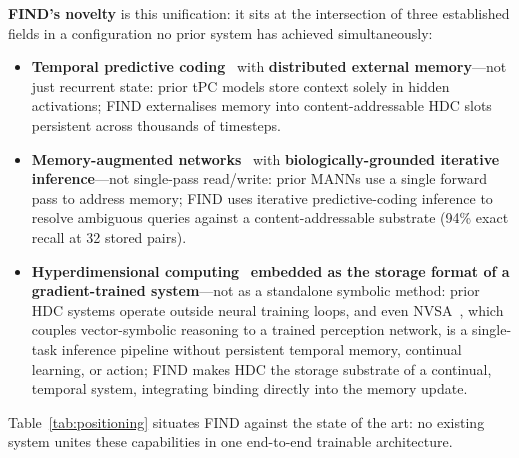 \noindent\textbf{FIND's novelty} is this unification: it sits at the intersection of three established fields in a configuration no prior system has achieved simultaneously:
\begin{itemize}[noitemsep,topsep=2pt]
  \item \textbf{Temporal predictive coding}~\cite{millidge2024temporal} with \textbf{distributed external memory}---not just recurrent state: prior tPC models store context solely in hidden activations; FIND externalises memory into content-addressable HDC slots persistent across thousands of timesteps.
  \item \textbf{Memory-augmented networks}~\cite{graves2016dnc} with \textbf{biologically-grounded iterative inference}---not single-pass read/write: prior MANNs use a single forward pass to address memory; FIND uses iterative predictive-coding inference to resolve ambiguous queries against a content-addressable substrate (94\% exact recall at 32 stored pairs).
  \item \textbf{Hyperdimensional computing}~\cite{kanerva2009hyperdimensional} \textbf{embedded as the storage format of a gradient-trained system}---not as a standalone symbolic method: prior HDC systems operate outside neural training loops, and even NVSA~\cite{hersche2023nvsa}, which couples vector-symbolic reasoning to a trained perception network, is a single-task inference pipeline without persistent temporal memory, continual learning, or action; FIND makes HDC the storage substrate of a continual, temporal system, integrating binding directly into the memory update.
\end{itemize}

\noindent Table~\ref{tab:positioning} situates FIND against the state of the art: no existing system unites these capabilities in one end-to-end trainable architecture.

